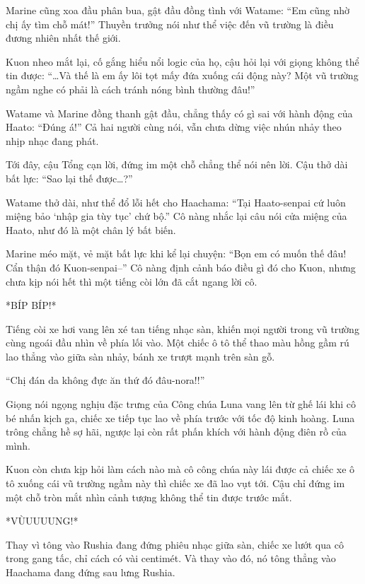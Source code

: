 \documentclass[../main.tex]{subfiles}
\begin{document}
Marine cũng xoa đầu phân bua, gật đầu đồng tình với Watame: ``Em cũng nhờ chị ấy tìm chỗ mát!'' Thuyền trưởng nói như thể việc đến vũ trường là điều đương nhiên nhất thế giới.

Kuon nheo mắt lại, cố gắng hiểu nổi logic của họ, cậu hỏi lại với giọng không thể tin được: ``\dots Và thế là em ấy lôi tọt mấy đứa xuống cái động này? Một vũ trường ngầm nghe có phải là cách tránh nóng bình thường đâu!''

Watame và Marine đồng thanh gật đầu, chẳng thấy có gì sai với hành động của Haato: ``Đúng á!'' Cả hai người cùng nói, vẫn chưa dừng việc nhún nhảy theo nhịp nhạc đang phát.

Tới đây, cậu Tổng cạn lời, đứng im một chỗ chẳng thể nói nên lời. Cậu thở dài bất lực: ``Sao lại thế được\dots?''

Watame thở dài, như thể đổ lỗi hết cho Haachama: ``Tại Haato-senpai cứ luôn miệng bảo `nhập gia tùy tục' chứ bộ.'' Cô nàng nhắc lại câu nói cửa miệng của Haato, như đó là một chân lý bất biến.

Marine méo mặt, vẻ mặt bất lực khi kể lại chuyện: ``Bọn em có muốn thế đâu! Cẩn thận đó Kuon-senpai--'' Cô nàng định cảnh báo điều gì đó cho Kuon, nhưng chưa kịp nói hết thì một tiếng còi lớn đã cắt ngang lời cô.

*BÍP BÍP!*

Tiếng còi xe hơi vang lên xé tan tiếng nhạc sàn, khiến mọi người trong vũ trường cùng ngoái đầu nhìn về phía lối vào. Một chiếc ô tô thể thao màu hồng gầm rú lao thẳng vào giữa sàn nhảy, bánh xe trượt mạnh trên sàn gỗ.

``Chị đán da không đực ăn thứ đó đâu-nora!!''


Giọng nói ngọng nghịu đặc trưng của Công chúa Luna vang lên từ ghế lái khi cô bé nhấn kịch ga, chiếc xe tiếp tục lao về phía trước với tốc độ kinh hoàng. Luna trông chẳng hề sợ hãi, ngược lại còn rất phấn khích với hành động điên rồ của mình.

Kuon còn chưa kịp hỏi làm cách nào mà cô công chúa này lái được cả chiếc xe ô tô xuống cái vũ trường ngầm này thì chiếc xe đã lao vụt tới. Cậu chỉ đứng im một chỗ tròn mắt nhìn cảnh tượng không thể tin được trước mắt.

*VÙUUUUNG!*

Thay vì tông vào Rushia đang đứng phiêu nhạc giữa sàn, chiếc xe lướt qua cô trong gang tấc, chỉ cách có vài centimét. Và thay vào đó, nó tông thẳng vào Haachama đang đứng sau lưng Rushia.
\end{document}
